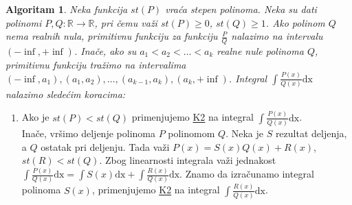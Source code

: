 \documentclass{article}
\newtheorem{alg}{Algoritam}[section]
\begin{document}
\begin{algbox}
    \begin{alg}
        Neka funkcija $st\left(P\right)$ vraća stepen polinoma.
        Neka su dati polinomi $P, Q: \mathbb{R} \longrightarrow \mathbb{R}$, pri čemu
        važi $st\left(P\right)\geq0$, $st\left(Q\right)\geq1$. Ako polinom $Q$ nema realnih nula, primitivnu funkciju
        za funkciju $\displaystyle\frac{P}{Q}$ nalazimo na intervalu $\left(-\inf, +\inf\right)$. Inače,
        ako su $a_1 < a_2 < \dotsc < a_k$ realne nule polinoma $Q$, primitivnu funkciju
        tražimo na intervalima $\left(-\inf, a_1\right),\left(a_1, a_2\right),\dotsc,\left(a_{k-1},a_k\right),\left(a_k,+\inf\right)$.
        Integral $\displaystyle\int\frac{P\left(x\right)}{Q\left(x\right)}\text{dx}$ nalazimo sledećim koracima:
    \end{alg}
    \begin{enumerate}[label=\text{K\arabic*}]
        \item\label{algoritam_1_K1}
              Ako je $st\left(P\right) < st\left(Q\right)$ primenjujemo \hyperref[algoritam_1_K2]{K2} na integral $\displaystyle\int \frac{P\left(x\right)}{Q\left(x\right)}\text{dx}$.\\
              Inače, vršimo deljenje polinoma $P$ polinomom $Q$.
              Neka je $S$ rezultat deljenja, a $Q$ ostatak pri deljenju.
              Tada važi $P\left(x\right) = S\left(x\right)Q\left(x\right) + R\left(x\right)$, $st\left(R\right)<st\left(Q\right)$.
              Zbog linearnosti integrala važi jednakost $\displaystyle\int\frac{P\left(x\right)}{Q\left(x\right)}\text{dx} = \int S\left(x\right)\text{dx} + \int\frac{R\left(x\right)}{Q\left(x\right)}\text{dx}$.
              Znamo da izračunamo integral polinoma $S\left(x\right)$, primenjujemo \hyperref[algoritam_1_K2]{K2}
              na integral $\displaystyle\int \frac{R\left(x\right)}{Q\left(x\right)}\text{dx}$.


\end{enumerate}
\end{algbox}
\end{document}
